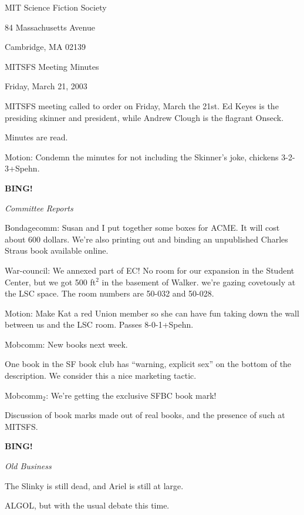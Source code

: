 \documentclass[12pt]{article}
\newcommand{\bing}{{\bf BING!} }
\newcommand{\goto}[1]{\bing \vskip 12pt \centerline{{\em{#1}}}}
\begin{document}
\begin{center}

MIT Science Fiction Society 

84 Massachusetts Avenue

Cambridge, MA 02139

\vspace{12pt}

MITSFS Meeting Minutes 

Friday, March 21, 2003

\end{center}
 
\vspace{18pt}

\setlength{\parskip}{6pt}

\noindent
MITSFS meeting called to order on Friday, March the 21st.  Ed Keyes is the presiding skinner and president, while Andrew Clough is the flagrant Onseck.

Minutes are read.

Motion:  Condemn the minutes for not including the Skinner's joke, chickens 3-2-3+Spehn.

\goto{Committee Reports}

Bondagecomm:  Susan and I put together some boxes for ACME.  It will cost about 600 dollars.  We're also printing out and binding an unpublished Charles Straus book available online.

War-council:  We annexed part of EC!  No room for our expansion in the Student Center, but we got 500 ft$^2$ in the basement of Walker.  we're gazing covetously at the LSC space.  The room numbers are 50-032 and 50-028.

Motion:  Make Kat a red Union member so she can have fun taking down the wall between us and the LSC room.  Passes 8-0-1+Spehn.

Mobcomm:  New books next week.

One book in the SF book club has ``warning, explicit sex'' on the bottom of the description.  We consider this a nice marketing tactic.

Mobcomm$_2$:  We're getting the exclusive SFBC book mark!

Discussion of book marks made out of real books, and the presence of such at MITSFS.

\goto{Old Business}

The Slinky is still dead, and Ariel is still at large.

ALGOL, but with the usual debate this time.
\end{document}
